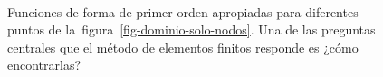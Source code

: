 \documentclass[
  12pt,
  a4paper,
  table]{scrbook}
\theoremstyle{plain}
\theoremstyle{definition}
\theoremstyle{plain}
\theoremstyle{plain}
\theoremstyle{remark}
\begin{document}
\begin{figure}
\begin{minipage}[t]{0.47\linewidth}
{\centering 


}

\end{minipage}%
%
\begin{minipage}[t]{0.05\linewidth}

{\centering 

~

}

\end{minipage}%
%
\begin{minipage}[t]{0.47\linewidth}

{\centering 


}

\end{minipage}%

\caption{\label{fig-shape-function-first-order}Funciones de forma de
primer orden apropiadas para diferentes puntos de
la~figura~\ref{fig-dominio-solo-nodos}. Una de las preguntas centrales
que el método de elementos finitos responde es ¿cómo encontrarlas?}

\end{figure}
\end{document}
